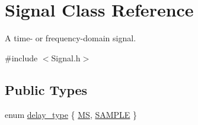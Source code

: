 \hypertarget{classSignal}{\section{\-Signal \-Class \-Reference}
\label{classSignal}
}


\-A time-\/ or frequency-\/domain signal.  




{\ttfamily \#include $<$\-Signal.\-h$>$}

\subsection*{\-Public \-Types}
\begin{DoxyCompactItemize}
\item 
enum \hyperlink{classSignal_a45a2f1394f9d0be6fbaaf5160fa4817c}{delay\-\_\-type} \{ \hyperlink{classSignal_a45a2f1394f9d0be6fbaaf5160fa4817caef04e6566ce27c94225e907c909af620}{\-M\-S}, 
\hyperlink{classSignal_a45a2f1394f9d0be6fbaaf5160fa4817ca29508a29e1f1dfb176239b6eb843c53d}{\-S\-A\-M\-P\-L\-E}
 \}
\end{DoxyCompactItemize}
